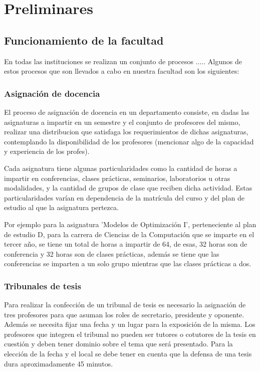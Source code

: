 \chapter{Preliminares}\label{chapter:preliminaries}


\section{Funcionamiento de la facultad}
En todas las instituciones se realizan un conjunto de procesos .....
Algunos de estos procesos que son llevados a cabo en nuestra facultad son 
los siguientes:

\subsection{Asignación de docencia}
El proceso de asignación de docencia en un departamento consiste, en 
dadas las asignaturas a impartir en un semestre y el conjunto de 
profesores del mismo, realizar una distribucion que satisfaga los
requerimientos de dichas asignaturas, contemplando la disponibilidad
de los profesores (mencionar algo de la capacidad y experiencia de los 
profes).

Cada asignatura tiene algunas particularidades como la cantidad de horas
a impartir en conferencias, clases prácticas, seminarios, laboratorios u
otras modalidades, y la cantidad de grupos de clase que reciben dicha 
actividad. Estas particularidades varían en dependencia de la matrícula 
del curso y del plan de estudio al que la asignatura pertezca.

Por ejemplo para la asignatura 'Modelos de Optimización I', perteneciente
al plan de estudio D, para la carrera de Ciencias de la Computación que 
se imparte en el tercer año, se tiene un total de horas a impartir de 64,
de esas, 32 horas son de conferencia y 32 horas son de clases prácticas,
además se tiene que las conferencias se imparten a un solo grupo mientras
que las clases prácticas a dos.

\subsection{Tribunales de tesis}
Para realizar la confección de un tribunal de tesis es necesario la
asignación de tres profesores para que asuman los roles de secretario,
presidente y oponente. Además se necesita fijar una fecha y un lugar para 
la exposición de la misma.
Los profesores que integren el tribunal no pueden ser tutores o cotutores
de la tesis en cuestión y deben tener dominio sobre el tema que será 
presentado.
Para la elección de la fecha y el local se debe tener en cuenta que la 
defensa de una tesis dura aproximadamente 45 minutos.

